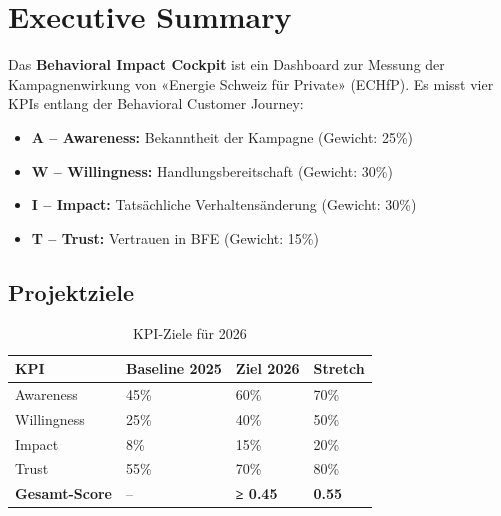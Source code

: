 \documentclass[11pt,a4paper]{article}
\begin{document}
\tableofcontents
\newpage

\section{Executive Summary}

\begin{tcolorbox}[fabox]
Das \textbf{Behavioral Impact Cockpit} ist ein Dashboard zur Messung der Kampagnenwirkung von «Energie Schweiz für Private» (ECHfP). Es misst vier KPIs entlang der Behavioral Customer Journey:

\begin{itemize}[leftmargin=*]
    \item \textbf{A -- Awareness:} Bekanntheit der Kampagne (Gewicht: 25\%)
    \item \textbf{W -- Willingness:} Handlungsbereitschaft (Gewicht: 30\%)
    \item \textbf{I -- Impact:} Tatsächliche Verhaltensänderung (Gewicht: 30\%)
    \item \textbf{T -- Trust:} Vertrauen in BFE (Gewicht: 15\%)
\end{itemize}
\end{tcolorbox}

\subsection{Projektziele}

\begin{table}[h]
\centering
{}
\begin{tabular}{L{3cm}C{2.5cm}C{2.5cm}C{2.5cm}}
\toprule
\textbf{KPI} & \textbf{Baseline 2025} & \textbf{Ziel 2026} & \textbf{Stretch} \\
\midrule
Awareness & 45\% & 60\% & 70\% \\
Willingness & 25\% & 40\% & 50\% \\
Impact & 8\% & 15\% & 20\% \\
Trust & 55\% & 70\% & 80\% \\
\midrule
\textbf{Gesamt-Score} & -- & \textbf{≥ 0.45} & \textbf{0.55} \\
\bottomrule
\end{tabular}
\caption{KPI-Ziele für 2026}
\end{table}
\end{document}
